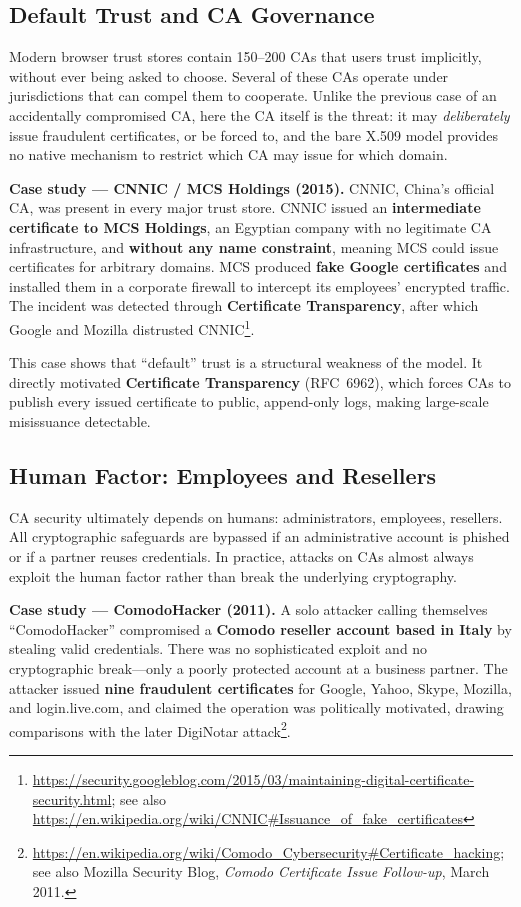 \documentclass[10pt,twocolumn]{article}
\begin{document}
\subsection{Default Trust and CA Governance}

Modern browser trust stores contain 150--200 CAs that users trust
implicitly, without ever being asked to choose. Several of these CAs operate
under jurisdictions that can compel them to cooperate. Unlike the previous
case of an accidentally compromised CA, here the CA itself is the threat:
it may \emph{deliberately} issue fraudulent certificates, or be forced to,
and the bare X.509 model provides no native mechanism to restrict which CA
may issue for which domain.

\textbf{Case study --- CNNIC / MCS Holdings (2015).} CNNIC, China's official
CA, was present in every major trust store. CNNIC issued an
\textbf{intermediate certificate to MCS Holdings}, an Egyptian company with
no legitimate CA infrastructure, and \textbf{without any name constraint},
meaning MCS could issue certificates for arbitrary domains. MCS produced
\textbf{fake Google certificates} and installed them in a corporate firewall
to intercept its employees' encrypted traffic. The incident was detected
through \textbf{Certificate Transparency}, after which Google and Mozilla
distrusted CNNIC\footnote{\url{https://security.googleblog.com/2015/03/maintaining-digital-certificate-security.html}; see also \url{https://en.wikipedia.org/wiki/CNNIC\#Issuance_of_fake_certificates}}.

This case shows that ``default'' trust is a structural weakness of the
model. It directly motivated \textbf{Certificate Transparency} (RFC~6962),
which forces CAs to publish every issued certificate to public,
append-only logs, making large-scale misissuance detectable.

\subsection{Human Factor: Employees and Resellers}

CA security ultimately depends on humans: administrators, employees,
resellers. All cryptographic safeguards are bypassed if an administrative
account is phished or if a partner reuses credentials. In practice, attacks
on CAs almost always exploit the human factor rather than break the
underlying cryptography.

\textbf{Case study --- ComodoHacker (2011).} A solo attacker calling
themselves ``ComodoHacker'' compromised a \textbf{Comodo reseller account
based in Italy} by stealing valid credentials. There was no sophisticated
exploit and no cryptographic break---only a poorly protected account at a
business partner. The attacker issued \textbf{nine fraudulent certificates}
for Google, Yahoo, Skype, Mozilla, and login.live.com, and claimed the
operation was politically motivated, drawing comparisons with the later
DigiNotar attack\footnote{\url{https://en.wikipedia.org/wiki/Comodo_Cybersecurity\#Certificate_hacking}; see also Mozilla Security Blog, \textit{Comodo Certificate Issue Follow-up}, March 2011.}.
\end{document}

